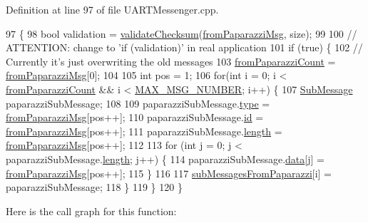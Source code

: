 Definition at line 97 of file U\+A\+R\+T\+Messenger.\+cpp.


\begin{DoxyCode}
97                                                 \{
98     \textcolor{keywordtype}{bool} validation = \hyperlink{class_u_a_r_t_messenger_a8e90d75bc44daee10b5d6cf70e1c1fb4}{validateChecksum}(\hyperlink{class_u_a_r_t_messenger_a0cdc15059654a4231fcfe312612c73f3}{fromPaparazziMsg}, size);
99 
100     \textcolor{comment}{// ATTENTION: change to 'if (validation)' in real application}
101     \textcolor{keywordflow}{if} (\textcolor{keyword}{true}) \{
102         \textcolor{comment}{// Currently it's just overwriting the old messages}
103         \hyperlink{class_u_a_r_t_messenger_a72ecf1c51d6a28c582fff9fd454145dd}{fromPaparazziCount} = \hyperlink{class_u_a_r_t_messenger_a0cdc15059654a4231fcfe312612c73f3}{fromPaparazziMsg}[0];
104 
105         \textcolor{keywordtype}{int} pos = 1;
106         \textcolor{keywordflow}{for}(\textcolor{keywordtype}{int} i = 0; i < \hyperlink{class_u_a_r_t_messenger_a72ecf1c51d6a28c582fff9fd454145dd}{fromPaparazziCount} && i < 
      \hyperlink{_u_a_r_t_messenger_8h_a6274d6c4801975be4baacd279386909d}{MAX\_MSG\_NUMBER}; i++) \{
107             \hyperlink{struct_sub_message}{SubMessage} paparazziSubMessage;
108 
109             paparazziSubMessage.\hyperlink{struct_sub_message_a064f1d26d553da776dc749d37a18a499}{type} = \hyperlink{class_u_a_r_t_messenger_a0cdc15059654a4231fcfe312612c73f3}{fromPaparazziMsg}[pos++];
110             paparazziSubMessage.\hyperlink{struct_sub_message_af3acc450c0686d7a9d15ccd9d548cb6d}{id} = \hyperlink{class_u_a_r_t_messenger_a0cdc15059654a4231fcfe312612c73f3}{fromPaparazziMsg}[pos++];
111             paparazziSubMessage.\hyperlink{struct_sub_message_a276e06f5335ca7857c21ac8c0e51bd6d}{length} = \hyperlink{class_u_a_r_t_messenger_a0cdc15059654a4231fcfe312612c73f3}{fromPaparazziMsg}[pos++];
112 
113             \textcolor{keywordflow}{for} (\textcolor{keywordtype}{int} j = 0; j < paparazziSubMessage.\hyperlink{struct_sub_message_a276e06f5335ca7857c21ac8c0e51bd6d}{length}; j++) \{
114                 paparazziSubMessage.\hyperlink{struct_sub_message_a7d923c5cdaa380c27d7c4cf60ea7c1be}{data}[j] = \hyperlink{class_u_a_r_t_messenger_a0cdc15059654a4231fcfe312612c73f3}{fromPaparazziMsg}[pos++];
115             \}
116 
117             \hyperlink{class_u_a_r_t_messenger_ad6fb0fea8b0262d46cc97f5d5b262a51}{subMessagesFromPaparazzi}[i] = paparazziSubMessage;
118         \}
119     \}
120 \}
\end{DoxyCode}
Here is the call graph for this function\+:\nopagebreak
